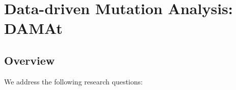 \clearpage
\section{Data-driven Mutation Analysis: DAMAt}

\renewcommand{\APPR}{\textit{DAMAt}\xspace}

\subsection{Overview}

We address the following research questions:

%    
%    
%
%

